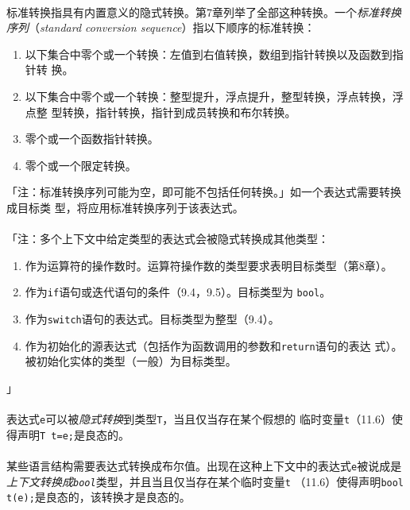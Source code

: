 
\paragraph{}
标准转换指具有内置意义的隐式转换。第7章列举了全部这种转换。一个\textit{标准转换
序列}（\textit{standard conversion sequence}）指以下顺序的标准转换：
\begin{enumerate}
  \item{以下集合中零个或一个转换：左值到右值转换，数组到指针转换以及函数到指针转
    换。}
  \item{以下集合中零个或一个转换：整型提升，浮点提升，整型转换，浮点转换，浮点整
    型转换，指针转换，指针到成员转换和布尔转换。}
  \item{零个或一个函数指针转换。}
  \item{零个或一个限定转换。}
\end{enumerate}
「注：标准转换序列可能为空，即可能不包括任何转换。」如一个表达式需要转换成目标类
型，将应用标准转换序列于该表达式。

\paragraph{}
「注：多个上下文中给定类型的表达式会被隐式转换成其他类型：
\begin{enumerate}
  \item{作为运算符的操作数时。运算符操作数的类型要求表明目标类型（第8章）。}
  \item{作为\texttt{if}语句或迭代语句的条件（9.4，9.5）。目标类型为
    \texttt{bool}。}
  \item{作为\texttt{switch}语句的表达式。目标类型为整型（9.4）。}
  \item{作为初始化的源表达式（包括作为函数调用的参数和\texttt{return}语句的表达
    式）。被初始化实体的类型（一般）为目标类型。}
\end{enumerate}」

\paragraph{}
表达式\texttt{e}可以被\textit{隐式转换}到类型\texttt{T}，当且仅当存在某个假想的
临时变量\texttt{t}（11.6）使得声明\texttt{T t=e;}是良态的。

\paragraph{}
某些语言结构需要表达式转换成布尔值。出现在这种上下文中的表达式\texttt{e}被说成是
\textit{上下文转换成\texttt{bool}}类型，并且当且仅当存在某个临时变量\texttt{t}
（11.6）使得声明\texttt{bool t(e);}是良态的，该转换才是良态的。

